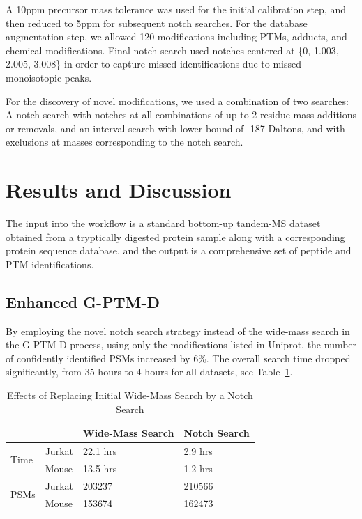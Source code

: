 \documentclass[journal=jprobs,manuscript=article]{achemso}
\begin{document}
A 10ppm precursor mass tolerance was used for the initial calibration step, and then reduced to 5ppm for subsequent notch searches.
For the database augmentation step, we allowed 120 modifications including PTMs, adducts, and chemical modifications.
Final notch search used notches centered at \{0, 1.003, 2.005, 3.008\} in order to capture missed identifications due to missed monoisotopic peaks.

For the discovery of novel modifications, we used a combination of two searches: A notch search with notches at all combinations of up to 2 residue mass additions or removals, and an interval search with lower bound of -187 Daltons, and with exclusions at masses corresponding to the notch search.

\section{Results and Discussion}

The input into the workflow is a standard bottom-up tandem-MS dataset obtained from a tryptically digested protein sample along with a corresponding protein sequence database, and the output is a comprehensive set of peptide and PTM identifications.
 
\subsection{Enhanced G-PTM-D}

By employing the novel notch search strategy instead of the wide-mass search in the G-PTM-D process, using only the modifications listed in Uniprot, the number of confidently identified PSMs increased by 6\%.
The overall search time dropped significantly, from 35 hours to 4 hours for all datasets, see Table~\ref{my-label}. 

\begin{table}[]
\centering
\caption{Effects of Replacing Initial Wide-Mass Search by a Notch Search}
\label{my-label}
\begin{tabular}{ll|l|l}
                      &        & Wide-Mass Search & Notch Search\\
\hline
\multirow{2}{*}{Time} & Jurkat & 22.1 hrs         & 2.9 hrs    \\
                      & Mouse  & 13.5 hrs         & 1.2 hrs   \\
\hline
\multirow{2}{*}{PSMs} & Jurkat & 203237           & 210566    \\
                      & Mouse  & 153674           & 162473   
\end{tabular}
\end{table}
\end{document}

